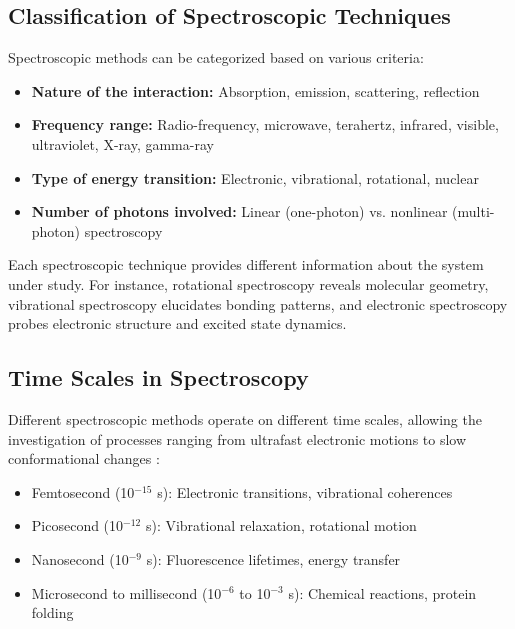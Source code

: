 \subsection{Classification of Spectroscopic Techniques}
\label{subsec:spectroscopy_classification}

\noindent Spectroscopic methods can be categorized based on various criteria:

\begin{itemize}
    \item \textbf{Nature of the interaction:} Absorption, emission, scattering, reflection
    \item \textbf{Frequency range:} Radio-frequency, microwave, terahertz, infrared, visible, ultraviolet, X-ray, gamma-ray
    \item \textbf{Type of energy transition:} Electronic, vibrational, rotational, nuclear
    \item \textbf{Number of photons involved:} Linear (one-photon) vs. nonlinear (multi-photon) spectroscopy
\end{itemize}

\noindent Each spectroscopic technique provides different information about the system under study. For instance, rotational spectroscopy reveals molecular geometry, vibrational spectroscopy elucidates bonding patterns, and electronic spectroscopy probes electronic structure and excited state dynamics.

\subsection{Time Scales in Spectroscopy}
\label{subsec:time_scales}

\noindent Different spectroscopic methods operate on different time scales, allowing the investigation of processes ranging from ultrafast electronic motions to slow conformational changes \cite{Fuller2015, Fayer2009}:

\begin{itemize}
    \item Femtosecond (10$^{-15}$ s): Electronic transitions, vibrational coherences
    \item Picosecond (10$^{-12}$ s): Vibrational relaxation, rotational motion
    \item Nanosecond (10$^{-9}$ s): Fluorescence lifetimes, energy transfer
    \item Microsecond to millisecond (10$^{-6}$ to 10$^{-3}$ s): Chemical reactions, protein folding
\end{itemize}

